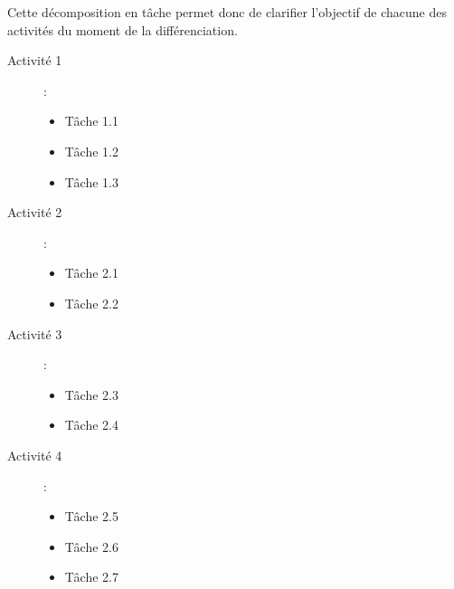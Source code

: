 Cette décomposition en tâche permet donc de clarifier l'objectif de chacune des activités du moment de la différenciation.

\begin{description}
    \item[Activité 1] :
    \begin{itemize}
        \item Tâche 1.1
        \item Tâche 1.2
        \item Tâche 1.3
    \end{itemize}
    
    \item[Activité 2] :
    \begin{itemize}
        \item Tâche 2.1
        \item Tâche 2.2
    \end{itemize}
    
    \item[Activité 3] :
    \begin{itemize}
        \item Tâche 2.3
        \item Tâche 2.4
    \end{itemize}

    \item[Activité 4] :
    \begin{itemize}
        \item Tâche 2.5
        \item Tâche 2.6
        \item Tâche 2.7
    \end{itemize}
\end{description}

